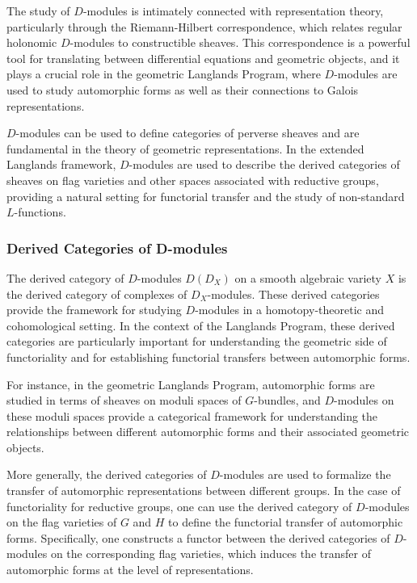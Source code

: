 \documentclass{article}
\theoremstyle{remark}
\begin{document}
The study of $D$-modules is intimately connected with representation theory, particularly through the Riemann-Hilbert correspondence, which relates regular holonomic $D$-modules to constructible sheaves. This correspondence is a powerful tool for translating between differential equations and geometric objects, and it plays a crucial role in the geometric Langlands Program, where $D$-modules are used to study automorphic forms as well as their connections to Galois representations.

$D$-modules can be used to define categories of perverse sheaves and are fundamental in the theory of geometric representations. In the extended Langlands framework, $D$-modules are used to describe the derived categories of sheaves on flag varieties and other spaces associated with reductive groups, providing a natural setting for functorial transfer and the study of non-standard $L$-functions.

\subsubsection{Derived Categories of D-modules}

The derived category of $D$-modules $D(D_X)$ on a smooth algebraic variety $X$ is the derived category of complexes of $D_X$-modules. These derived categories provide the framework for studying $D$-modules in a homotopy-theoretic and cohomological setting. In the context of the Langlands Program, these derived categories are particularly important for understanding the geometric side of functoriality and for establishing functorial transfers between automorphic forms.

For instance, in the geometric Langlands Program, automorphic forms are studied in terms of sheaves on moduli spaces of $G$-bundles, and $D$-modules on these moduli spaces provide a categorical framework for understanding the relationships between different automorphic forms and their associated geometric objects.

More generally, the derived categories of $D$-modules are used to formalize the transfer of automorphic representations between different groups. In the case of functoriality for reductive groups, one can use the derived category of $D$-modules on the flag varieties of $G$ and $H$ to define the functorial transfer of automorphic forms. Specifically, one constructs a functor between the derived categories of $D$-modules on the corresponding flag varieties, which induces the transfer of automorphic forms at the level of representations.
\end{document}
